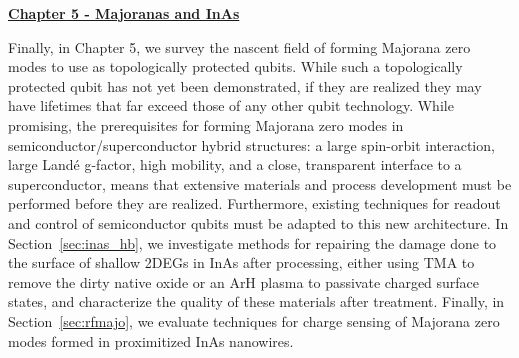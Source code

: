 \newpage
\noindent\textbf{\hyperref[sec:majoinas]{Chapter 5 - Majoranas and InAs}}

\noindent
Finally, in Chapter 5, we survey the nascent field of forming Majorana zero modes to use as topologically protected qubits. While
such a topologically protected qubit has not yet been demonstrated, if they are realized they may have lifetimes that far exceed those of
any other qubit technology. While promising, the prerequisites for forming Majorana zero modes in semiconductor/superconductor hybrid structures:
a large spin-orbit interaction, large Land\'e g-factor, high mobility, and a close, transparent interface to a superconductor, means that extensive
materials and process development must be performed before they are realized. Furthermore, existing techniques for readout and control of semiconductor
qubits must be adapted to this new architecture. In Section~\ref{sec:inas_hb}, we investigate methods for repairing the damage done to the surface of shallow
2DEGs in InAs after processing, either using TMA to remove the dirty native oxide or an ArH plasma to passivate charged surface states, and characterize
the quality of these materials after treatment. Finally, in Section~\ref{sec:rfmajo}, we evaluate techniques for charge sensing of Majorana zero modes formed
in proximitized InAs nanowires.